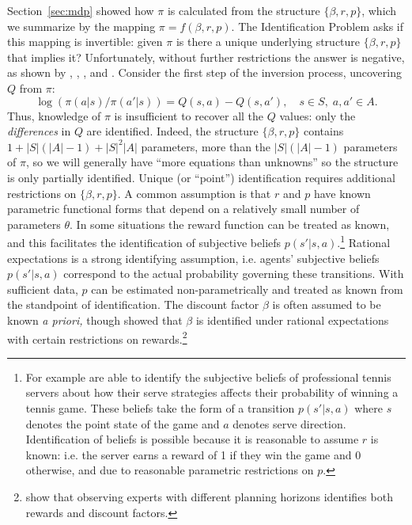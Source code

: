 Section~\ref{sec:mdp} showed how $\pi$ is calculated from the structure $\{\beta,r,p\}$, which
we summarize by the mapping $\pi=f(\beta,r,p)$. The Identification Problem asks if this mapping is invertible:
given $\pi$ is there a unique underlying structure $\{\beta,r,p\}$ that implies it? Unfortunately, without
further restrictions the answer is negative, as shown by \citet{hotzmiller:1993}, 
\citet{rust:1994}, \citet{nhr:1999}, and \citet{magnacthesmar:2002}. 
Consider the first step of the inversion process, uncovering  $Q$ from $\pi$:
\begin{equation}
               \log\left(\pi(a|s)/\pi(a'|s)\right) = Q(s,a)-Q(s,a'), \quad s \in S, \; a,a' \in A.
\label{eq:ccpinverse}
\end{equation}
Thus, knowledge of $\pi$ is insufficient to recover all the $Q$ values: only the {\it differences\/} in
$Q$ are identified. Indeed, the structure $\{\beta,r,p\}$ contains $1+|S|(|A|-1)+|S|^2|A|$  
parameters, more than the $|S|(|A|-1)$ parameters of $\pi$, so we will generally have ``more equations than unknowns'' 
so the structure is only partially identified. Unique (or ``point'') identification requires additional restrictions on $\{\beta,r,p\}$. 
A common assumption is that $r$ and $p$ have known parametric functional forms that depend on a relatively small number of parameters $\theta$. In some situations the reward function can be treated as
known, and this facilitates the identification of subjective beliefs $p(s'|s,a)$.\footnote{\footnotesize 
For example \citet{tennis:2025} are able to identify the subjective beliefs of professional tennis servers about how their serve
strategies affects their probability of winning a tennis game. These beliefs take the form of a transition $p(s'|s,a)$ where $s$ denotes
the point state of the game and $a$ denotes serve direction. Identification of beliefs is possible  because it is reasonable to assume
$r$ is known: i.e. the server earns a reward of 1 if they win the game and 0 otherwise, and due to reasonable parametric restrictions
on $p$.} Rational expectations is a strong identifying assumption, 
i.e. agents' subjective beliefs $p(s'|s,a)$ correspond to the actual probability governing
these transitions. With sufficient data, $p$ can be estimated non-parametrically and treated as known from the standpoint of 
identification.  The discount factor $\beta$ is often assumed to be known {\it a priori,\/} though \citet{abbringdaljord:2020} showed that $\beta$ is identified
under rational expectations with certain restrictions on rewards.\footnote{\footnotesize \citet{yao:2024} show that observing experts with different planning horizons identifies both rewards and discount factors.}

